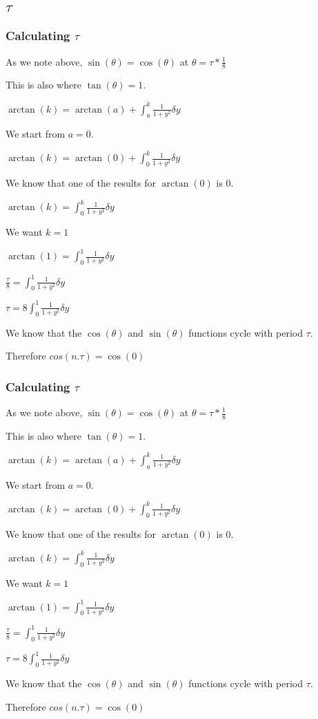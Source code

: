 
\subsection{\(\tau \)}

\subsubsection{Calculating \(\tau \)}

As we note above, \(\sin (\theta )=\cos (\theta )\) at \(\theta =\tau *\frac{1}{8}\)

This is also where \(\tan (\theta )=1\).

$\arctan (k)=\arctan (a)+\int_a^k\frac{1}{1+y^2} \delta y$

We start from \(a=0\).

$\arctan (k)=\arctan (0)+\int_0^k\frac{1}{1+y^2} \delta y$

We know that one of the results for \(\arctan (0)\) is \(0\).

$\arctan (k)=\int_0^k\frac{1}{1+y^2} \delta y$

We want \(k=1\)

$\arctan (1)=\int_0^1\frac{1}{1+y^2} \delta y$

$\frac{\tau }{8}=\int_0^1\frac{1}{1+y^2} \delta y$

$\tau =8\int_0^1\frac{1}{1+y^2} \delta y$

We know that the \(\cos (\theta )\) and \(\sin (\theta )\) functions cycle with period \(\tau \).

Therefore \(cos (n.\tau )=\cos (0)\)

\subsubsection{Calculating \(\tau \)}

As we note above, \(\sin (\theta )=\cos (\theta )\) at \(\theta =\tau *\frac{1}{8}\)

This is also where \(\tan (\theta )=1\).

$\arctan (k)=\arctan (a)+\int_a^k\frac{1}{1+y^2} \delta y$

We start from \(a=0\).

$\arctan (k)=\arctan (0)+\int_0^k\frac{1}{1+y^2} \delta y$

We know that one of the results for \(\arctan (0)\) is \(0\).

$\arctan (k)=\int_0^k\frac{1}{1+y^2} \delta y$

We want \(k=1\)

$\arctan (1)=\int_0^1\frac{1}{1+y^2} \delta y$

$\frac{\tau }{8}=\int_0^1\frac{1}{1+y^2} \delta y$

$\tau =8\int_0^1\frac{1}{1+y^2} \delta y$

We know that the \(\cos (\theta )\) and \(\sin (\theta )\) functions cycle with period \(\tau \).

Therefore \(cos (n.\tau )=\cos (0)\)

